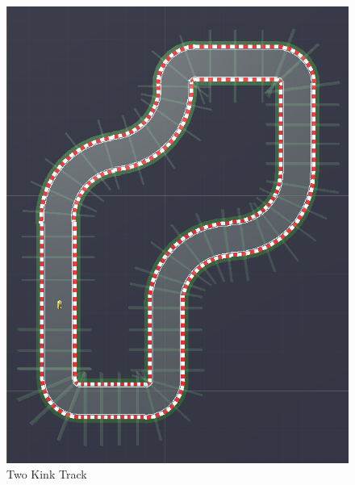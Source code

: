 \begin{figure}[H]
\begin{minipage}[b]{0.45\textwidth}
    \includegraphics[width=\textwidth]{images/tracks/EvenMoreComplicatedTrack.PNG}
    \caption{Two Kink Track}
    \label{fig:twokink}
  \end{minipage}
\end{figure}

